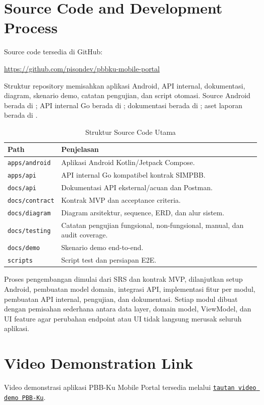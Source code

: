 \documentclass[conference]{report-assets/ref/IEEE-conference-template-062824/IEEEtran}
\begin{document}
\section{Source Code and Development Process}
Source code tersedia di GitHub:

\begin{center}
\url{https://github.com/pisondev/pbbku-mobile-portal}
\end{center}

Struktur repository memisahkan aplikasi Android, API internal, dokumentasi, diagram, skenario demo, catatan pengujian, dan script otomasi. Source Android berada di ; API internal Go berada di ; dokumentasi berada di ; aset laporan berada di .

\begin{table}[htbp]
\caption{Struktur Source Code Utama}
\centering
\scriptsize
\begin{tabular}{@{}p{} p{}@{}}
\toprule
Path & Penjelasan \\
\midrule
\texttt{apps/android} & Aplikasi Android Kotlin/Jetpack Compose. \\
\texttt{apps/api} & API internal Go kompatibel kontrak SIMPBB. \\
\texttt{docs/api} & Dokumentasi API eksternal/acuan dan Postman. \\
\texttt{docs/contract} & Kontrak MVP dan acceptance criteria. \\
\texttt{docs/diagram} & Diagram arsitektur, sequence, ERD, dan alur sistem. \\
\texttt{docs/testing} & Catatan pengujian fungsional, non-fungsional, manual, dan audit coverage. \\
\texttt{docs/demo} & Skenario demo end-to-end. \\
\texttt{scripts} & Script test dan persiapan E2E. \\
\bottomrule
\end{tabular}
\normalsize
\end{table}

Proses pengembangan dimulai dari SRS dan kontrak MVP, dilanjutkan setup Android, pembuatan model domain, integrasi API, implementasi fitur per modul, pembuatan API internal, pengujian, dan dokumentasi. Setiap modul dibuat dengan pemisahan sederhana antara data layer, domain model, ViewModel, dan UI feature agar perubahan endpoint atau UI tidak langsung merusak seluruh aplikasi.

\section{Video Demonstration Link}
Video demonstrasi aplikasi PBB-Ku Mobile Portal tersedia melalui \href{https://drive.google.com/file/d/1mojdkNnYKuWlF6PXWqTX6qZkbYufa3ch/view?usp=sharing}{\texttt{tautan video demo PBB-Ku}}.
\end{document}
